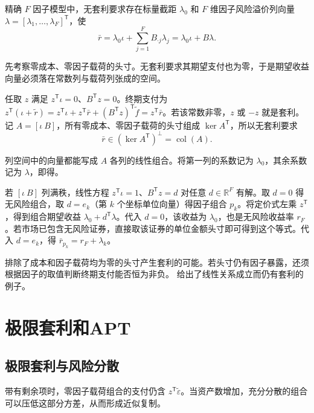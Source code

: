\begin{tcolorbox}[knowledge]
 精确 $F$ 因子模型中，无套利要求存在标量截距 $\lambda_0$ 和 $F$ 维因子风险溢价列向量 $\lambda=[\lambda_1,\ldots,\lambda_F]^{\mathsf T}$，使
\begin{equation}
 \bar r=\lambda_0\iota+\sum_{j=1}^F B_{\cdot j}\lambda_j=\lambda_0\iota+B\lambda.\label{eq:wj-14-6}
\end{equation}
\end{tcolorbox}

先考察零成本、零因子载荷的头寸。无套利要求其期望支付也为零，于是期望收益向量必须落在常数列与载荷列张成的空间。

\begin{solution}[label-content={证明},blank-type=none]
任取 $z$ 满足 $z^{\mathsf T}\iota=0$、$B^{\mathsf T}z=0$。终期支付为 $z^{\mathsf T}(\iota+\widetilde r)=z^{\mathsf T}\iota+z^{\mathsf T}\bar r+(B^{\mathsf T}z)^{\mathsf T}\widetilde f=z^{\mathsf T}\bar r$。若该常数非零，$z$ 或 $-z$ 就是套利。记 $A=[\iota\ B]$，所有零成本、零因子载荷的头寸组成 $\ker A^{\mathsf T}$，所以无套利要求
\[
 \bar r\in(\ker A^{\mathsf T})^\perp=\operatorname{col}(A).
\]

列空间中的向量都能写成 $A$ 各列的线性组合。将第一列的系数记为 $\lambda_0$，其余系数记为 $\lambda$，即得。
\end{solution}

若 $[\iota\ B]$ 列满秩，线性方程 $z^{\mathsf T}\iota=1$、$B^{\mathsf T}z=d$ 对任意 $d\in\mathbb R^F$ 有解。取 $d=0$ 得无风险组合，取 $d=e_k$（第 $k$ 个坐标单位向量）得因子组合 $p_k$。将定价式左乘 $z^{\mathsf T}$，得到组合期望收益 $\lambda_0+d^{\mathsf T}\lambda$。代入 $d=0$，该收益为 $\lambda_0$，也是无风险收益率 $r_F$。若市场已包含无风险证券，直接取该证券的单位金额头寸即可得到这个等式。代入 $d=e_k$，得 $\bar r_{p_k}=r_F+\lambda_k$。

 排除了成本和因子载荷均为零的头寸产生套利的可能。若头寸仍有因子暴露，还须根据因子的取值判断终期支付能否恒为非负。 给出了线性关系成立而仍有套利的例子。

\section{极限套利和APT}\label{sec:wj-fourteen-3}
\subsection{极限套利与风险分散}
带有剩余项时，零因子载荷组合的支付仍含 $z^{\mathsf T}\widetilde\varepsilon$。当资产数增加，充分分散的组合可以压低这部分方差，从而形成近似复制。

